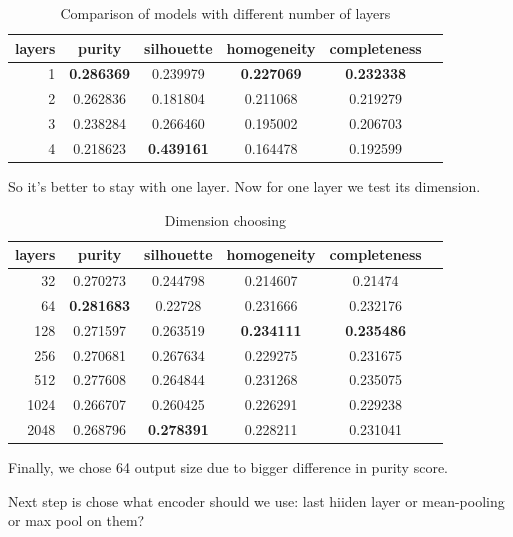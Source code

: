 \documentclass[11pt]{article}
\begin{document}
\begin{table}[htb]
\begin{center}
\begin{tabular}{ |r|c|c|c|c|c| }
\hline
layers & purity  & silhouette  & homogeneity  & completeness \\ \hline 
1  & \textbf{0.286369}  & 0.239979  & \textbf{0.227069}  & \textbf{0.232338}\\ \hline 
2  & 0.262836  & 0.181804  & 0.211068  & 0.219279\\ \hline 
3  & 0.238284  & 0.266460  & 0.195002  & 0.206703\\ \hline 
4  & 0.218623  & \textbf{0.439161}  & 0.164478  & 0.192599
\end{tabular}
\end{center}
\caption{Comparison of models with different number of layers}
\end{table}
\FloatBarrier

So it's better to stay with one layer. Now for one layer we test its dimension.

\begin{table}[htb]
\begin{center}
\begin{tabular}{ |r|c|c|c|c|c| }
\hline
layers & purity  & silhouette  & homogeneity  & completeness \\ \hline 
32  & 0.270273  & 0.244798  & 0.214607  & 0.21474\\ \hline 
64  & \textbf{0.281683}  & 0.22728  & 0.231666  & 0.232176\\ \hline 
128  & 0.271597  & 0.263519  & \textbf{0.234111}  & \textbf{0.235486}\\ \hline 
256  & 0.270681  & 0.267634  & 0.229275  & 0.231675\\ \hline 
512  & 0.277608  & 0.264844  & 0.231268  & 0.235075\\ \hline 
1024  & 0.266707  & 0.260425  & 0.226291  & 0.229238\\ \hline 
2048  & 0.268796  & \textbf{0.278391}  & 0.228211  & 0.231041 \\ \hline
\end{tabular}
\end{center}
\caption{Dimension choosing}
\end{table}
\FloatBarrier

Finally, we chose 64 output size due to bigger difference in purity score.

Next step is chose what encoder should we use: last hiiden layer or mean-pooling or max pool on them?
\end{document}
